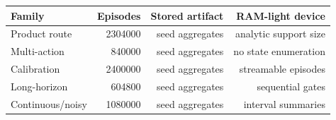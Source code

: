 \begin{tabular}{lrrr}
\toprule
Family & Episodes & Stored artifact & RAM-light device \\
\midrule
Product route & 2304000 & seed aggregates & analytic support size \\
Multi-action & 840000 & seed aggregates & no state enumeration \\
Calibration & 2400000 & seed aggregates & streamable episodes \\
Long-horizon & 604800 & seed aggregates & sequential gates \\
Continuous/noisy & 1080000 & seed aggregates & interval summaries \\
\bottomrule
\end{tabular}
